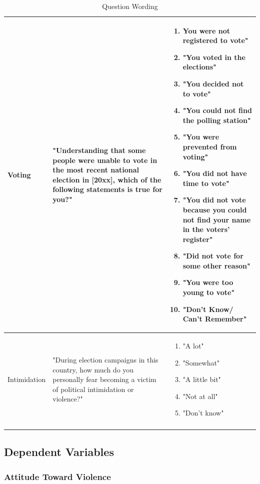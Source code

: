 \documentclass[12pt,]{book}
\theoremstyle{definition}
\theoremstyle{definition}
\theoremstyle{definition}
\theoremstyle{remark}
\begin{document}
\begin{longtable}{p{3cm} p{6cm} p{6cm}}
Voting & "Understanding that some people were unable to vote in the most recent national election in [20xx], which of the following statements is true for you?" & \begin{enumerate}
\item You were not registered to vote"
\item "You voted in the elections"
\item "You decided not to vote"
\item "You could not find the polling station"
\item"You were prevented from voting"
\item "You did not have time to vote"
\item "You did not vote because you could not find your name in the voters' register"
\item "Did not vote for some other reason"
\item "You were too young to vote"
\item "Don't Know/ Can't Remember"
\end{enumerate} \\
\hline
Intimidation & "During election campaigns in this country, how much do you personally fear becoming a victim of political intimidation or violence?" & \begin{enumerate}
\item "A lot" 
\item "Somewhat"
\item "A little bit" 
\item "Not at all" 
\item "Don’t know"
\end{enumerate} \\
\hline
\caption{Question Wording} \label{tab:wording}\\
\end{longtable}

\doublespacing

\hypertarget{dependent-variables}{%
\subsection{Dependent Variables}\label{dependent-variables}}

\hypertarget{attitude-toward-violence}{%
\subsubsection*{Attitude Toward
Violence}\label{attitude-toward-violence}}
\end{document}
